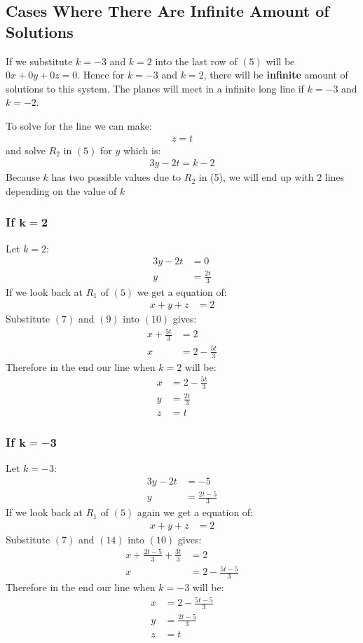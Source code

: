 \documentclass[12pt]{article}
\begin{document}
\subsection{Cases Where There Are Infinite Amount of Solutions}

If we substitute  $k = -3$ and $k =2$ into the last row of $(5)$
will be $0x + 0y + 0z = 0$. Hence for  $k = -3$ and $k =2$, there will be {\bf infinite} amount of solutions to this system. The planes will meet in a infinite long line if $k = -3$ and $k =-2$.

To solve for the line we can make:
\begin{align}
z=t
\end{align}
and solve $R_2$ in $(5)$ for $y$ which is:
\begin{align*}
3y-2t=k-2
\end{align*}
Because $k$ has two possible values due to $R_2$ in (5), we will end up with 2 lines depending on the value of $k$ \\
\subsubsection{If $\bm{k=2}$}
Let $k = 2$:
\begin{align}
3y-2t&=0 \\
y&=\frac{2t}{3}
\end{align}
If we look back at $R_1$ of $(5)$ we get a equation of:
\begin{align}
x+y+z&=2
\end{align}
Substitute $(7)$ and $(9)$ into $(10)$ gives:
\begin{align}
x+\frac{5t}{3}&=2 \\
x&= 2 -\frac{5t}{3}
\end{align}
Therefore in the end our line when $k = 2$ will be:
\begin{align*}
x&=2-\frac{5t}{3} \\
y&=\frac{2t}{3} \\ 
z&=t
\end{align*}

\newpage

\subsubsection{If $\bm{k=-3}$}
Let $k = -3$:
\begin{align}
3y-2t&=-5 \\
y&=\frac{2t-5}{3}
\end{align}
If we look back at $R_1$ of $(5)$ again we get a equation of:
\begin{align*}
x+y+z&=2
\end{align*}
Substitute $(7)$ and $(14)$ into $(10)$ gives:
\begin{align}
x+\frac{2t-5}{3}+\frac{3t}{3}&=2 \\
x&= 2 -\frac{5t-5}{3}
\end{align}
Therefore in the end our line when $k = -3$ will be:
\begin{align*}
x&=2-\frac{5t-5}{3} \\
y&=\frac{2t-5}{3} \\ 
z&=t
\end{align*}
\end{document}
